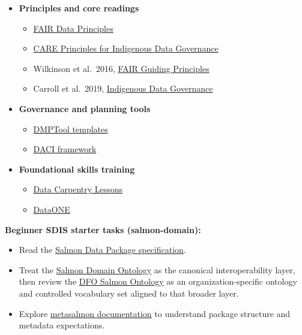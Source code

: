 \documentclass[
  letterpaper,
  DIV=11,
  numbers=noendperiod]{scrartcl}
\providecommand{\tightlist}{%
  \setlength{\itemsep}{0pt}\setlength{\parskip}{0pt}}
\begin{document}
\begin{itemize}
\tightlist
\item
  \textbf{Principles and core readings}

  \begin{itemize}
  \tightlist
  \item
    \href{https://www.go-fair.org/fair-principles/}{FAIR Data
    Principles}
  \item
    \href{https://www.gida-global.org/care}{CARE Principles for
    Indigenous Data Governance}
  \item
    Wilkinson et al.~2016,
    \href{https://doi.org/10.1038/sdata.2016.18}{FAIR Guiding
    Principles}
  \item
    Carroll et al.~2019,
    \href{https://doi.org/10.5334/dsj-2019-031}{Indigenous Data
    Governance}
  \end{itemize}
\item
  \textbf{Governance and planning tools}

  \begin{itemize}
  \tightlist
  \item
    \href{https://dmptool.org/public_templates?page=ALL}{DMPTool
    templates}
  \item
    \href{https://www.atlassian.com/team-playbook/plays/daci}{DACI
    framework}
  \end{itemize}
\item
  \textbf{Foundational skills training}

  \begin{itemize}
  \tightlist
  \item
    \href{https://datacarpentry.org/lessons/}{Data Carpentry Lessons}
  \item
    \href{https://www.dataone.org/}{DataONE}
  \end{itemize}
\end{itemize}

\textbf{Beginner SDIS starter tasks (salmon-domain):}

\begin{itemize}
\tightlist
\item
  Read the
  \href{https://github.com/dfo-pacific-science/smn-data-pkg/blob/main/SPECIFICATION.md}{Salmon
  Data Package specification}.
\item
  Treat the
  \href{https://github.com/salmon-data-mobilization/salmon-domain-ontology/}{Salmon
  Domain Ontology} as the canonical interoperability layer, then review
  the
  \href{https://dfo-pacific-science.github.io/dfo-salmon-ontology/}{DFO
  Salmon Ontology} as an organization-specific ontology and controlled
  vocabulary set aligned to that broader layer.
\item
  Explore
  \href{https://dfo-pacific-science.github.io/metasalmon/index.html}{metasalmon
  documentation} to understand package structure and metadata
  expectations.
\end{itemize}
\end{document}

